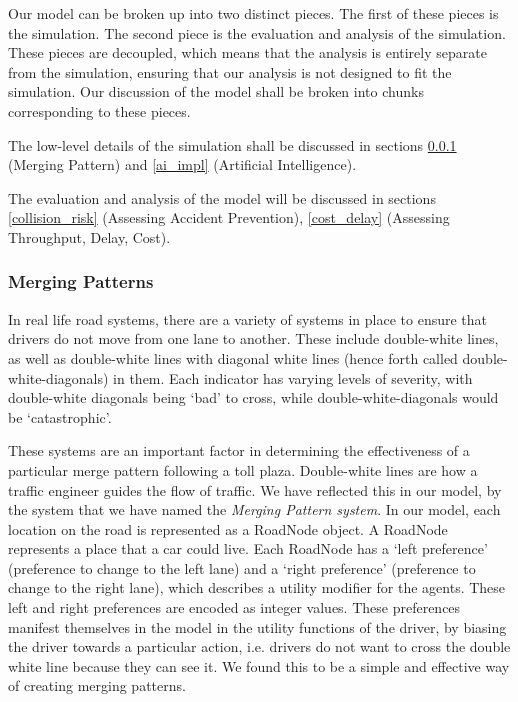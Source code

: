 \documentclass[a4paper, 11pt]{article}
\begin{document}
Our model can be broken up into two distinct pieces. The first of these pieces is the simulation. The second piece is the evaluation and analysis of the simulation. These pieces are decoupled, which means that the analysis is entirely separate from the simulation, ensuring that our analysis is not designed to fit the simulation. Our discussion of the model shall be broken into chunks corresponding to these pieces. 

The low-level details of the simulation shall be discussed in sections \ref{lane_top} (Merging Pattern) and \ref{ai_impl} (Artificial Intelligence). %

The evaluation and analysis of the model will be discussed in sections \ref{collision_risk} (Assessing Accident Prevention), \ref{cost_delay} (Assessing Throughput, Delay, Cost). %

\subsubsection{Merging Patterns}
\label{lane_top}

In real life road systems, there are a variety of systems in place to ensure that drivers do not move from one lane to another. These include double-white lines, as well as double-white lines with diagonal white lines (hence forth called double-white-diagonals) in them. Each indicator has varying levels of severity, with double-white diagonals being `bad' to cross, while double-white-diagonals would be `catastrophic'. 

These systems are an important factor in determining the effectiveness of a particular merge pattern following a toll plaza. Double-white lines are how a traffic engineer guides the flow of traffic. We have reflected this in our model, by the system that we have named the \textit{Merging Pattern system}. 
In our model, each location on the road is represented as a RoadNode object.
A RoadNode represents a place that a car could live. Each RoadNode has a `left preference' (preference to change to the left lane) and a `right preference' (preference to change to the right lane), which describes a utility modifier for the agents. These left and right preferences are encoded as integer values. These preferences manifest themselves in the model in the utility functions of the driver, by biasing the driver towards a particular action, i.e. drivers do not want to cross the double white line because they can see it. We found this to be a simple and effective way of creating merging patterns. 
\end{document}
